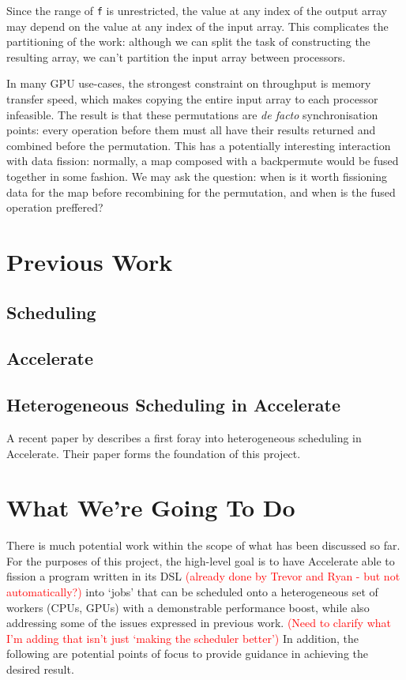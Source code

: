 \documentclass[a4paper,12pt]{article}
\newcommand{\red}[1]{\textcolor{red}{#1}}
\newcommand{\icf}[1]{\mbox{\texttt{#1}}}
\begin{document}
Since the range of \icf{f} is unrestricted, the value at any index of the output array may depend on the value at any index of the input array.
This complicates the partitioning of the work: although we can split the task of constructing the resulting array, we can't partition the input array between processors.

In many GPU use-cases, the strongest constraint on throughput is memory transfer speed, which makes copying the entire input array to each processor infeasible.
The result is that these permutations are \textit{de facto} synchronisation points: every operation before them must all have their results returned and combined before the permutation.
This has a potentially interesting interaction with data fission: normally, a map composed with a backpermute would be fused together in some fashion.
We may ask the question: when is it worth fissioning data for the map before recombining for the permutation, and when is the fused operation preffered?

\section{Previous Work}

\subsection{Scheduling}

\subsection{Accelerate}

\subsection{Heterogeneous Scheduling in Accelerate}
A recent paper by \citet*{newton_converting_2014} describes a first foray into heterogeneous scheduling in Accelerate.
Their paper forms the foundation of this project.

\section{What We're Going To Do}
There is much potential work within the scope of what has been discussed so far.
For the purposes of this project, the high-level goal is to have Accelerate able to fission a program written in its DSL \red{(already done by Trevor and Ryan - but not automatically?)} into `jobs' that can be scheduled onto a heterogeneous set of workers (CPUs, GPUs) with a demonstrable performance boost, while also addressing some of the issues expressed in previous work.
\red{(Need to clarify what I'm adding that isn't just `making the scheduler better')}
In addition, the following are potential points of focus to provide guidance in achieving the desired result.
\end{document}
